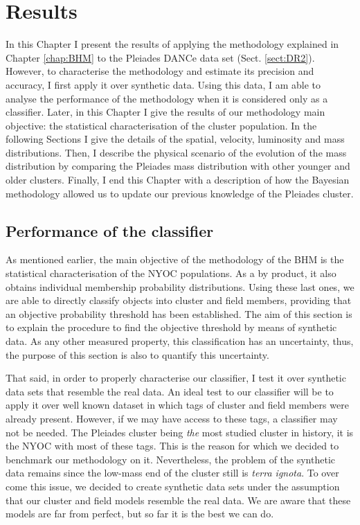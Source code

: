 \chapter{Results}
\label{chap:Results}
In this Chapter I present the results of applying the methodology explained in Chapter \ref{chap:BHM} to the Pleiades DANCe data set (Sect. \ref{sect:DR2}). However, to characterise the methodology and estimate its precision and accuracy, I first apply it over synthetic data. Using this data, I am able to analyse the performance of the methodology when it is considered only as a classifier. Later, in this Chapter I give the results of our methodology main objective: the statistical characterisation of the cluster population. In the following Sections I give the details of the spatial, velocity, luminosity and mass distributions. Then, I describe the physical scenario of the evolution of the mass distribution by comparing the Pleiades mass distribution with other younger and older clusters. Finally, I end this Chapter with a description of how the Bayesian methodology allowed us to update our previous knowledge of the Pleiades cluster.

\section{Performance of the classifier}
\label{sect:classifier}
As mentioned earlier, the main objective of the methodology of the BHM is the statistical characterisation of the NYOC populations. As a by product, it also obtains individual membership probability distributions. Using these last ones, we are able to directly classify objects into cluster and field members, providing that an objective probability threshold has been established. The aim of this section is to explain the procedure to find the objective threshold by means of synthetic data. As any other measured property, this classification has an uncertainty, thus, the purpose of this section is also to quantify this uncertainty. 

That said, in order to properly characterise our classifier, I test it over synthetic data sets that resemble the real data. An ideal test to our classifier will be to apply it over well known dataset in which tags of cluster and field members were already present. However, if we may have access to these tags, a classifier may not be needed. The Pleiades cluster being \emph{the} most studied cluster in history, it is the  NYOC with most of these tags. This is the reason for which we decided to benchmark our methodology on it. Nevertheless, the problem of the synthetic data remains since the low-mass end of the cluster still is \emph{terra ignota}. To over come this issue, we decided to create synthetic data sets under the assumption that our cluster and field models resemble the real data.  We are aware that these models are far from perfect, but so far it is the best we can do. 

